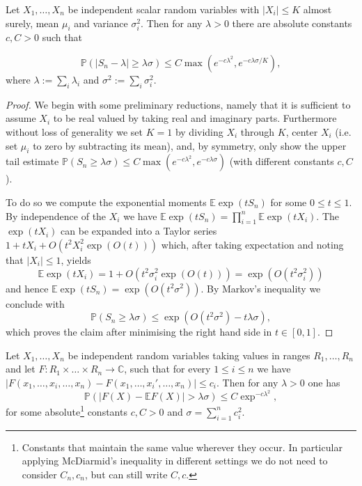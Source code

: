 \begin{theorem}
	Let $X_1,\dots,X_n$ be independent scalar random variables with $|X_i|\leq K$ almost surely, mean $\mu_i$ and variance $\sigma_i^2$. Then for any $\lambda>0$ there are absolute constants $c,C>0$ such that 
	
	$$\mathbb P(|S_n-\lambda|\geq\lambda\sigma)\leq C\max(e^{-c\lambda^2}, e^{-c\lambda\sigma/K}),$$
	where $\lambda:=\sum_i \lambda_i$ and $\sigma^2:=\sum_i \sigma_i^2$.
\end{theorem}
\begin{proof}
	We begin with some preliminary reductions, namely that it is sufficient to assume $X_i$ to be real valued by taking real and imaginary parts. Furthermore without loss of generality we set $K=1$ by dividing $X_i$ through $K$, center $X_i$ (i.e. set $\mu_i$ to zero by subtracting its mean), and, by symmetry, only show the upper tail estimate $\mathbb P(S_n\geq\lambda\sigma)\leq C\max(e^{-c\lambda^2}, e^{-c\lambda\sigma})$ (with different constants $c,C$).
	
	To do so we compute the exponential moments $\mathbb E \exp(tS_n)$ for some $0\leq t\leq 1$. By independence of the $X_i$ we have $\mathbb E \exp(tS_n)=\prod_{i=1}^n \mathbb E \exp(tX_i)$. The $\exp(tX_i)$ can be expanded into a Taylor series $1+tX_i+O(t^2X_i^2\exp(O(t)))$ which, after taking expectation and noting that $|X_i|\leq 1$, yields
	$$\mathbb E\exp(tX_i)=1+O(t^2\sigma_i^2\exp(O(t)))=\exp(O(t^2\sigma_i^2))$$
	and hence $\mathbb E\exp(tS_n)=\exp(O(t^2\sigma^2))$. By Markov's inequality we conclude with $$\mathbb P(S_n\geq\lambda\sigma)\leq\exp(O(t^2\sigma^2)-t\lambda\sigma),$$ which proves the claim after minimising the right hand side in $t\in[0,1]$.
\end{proof}

\begin{theorem}
	Let $X_1,\dots,X_n$ be independent random variables taking values in ranges $R_1,\dots,R_n$ and let $F:R_1\times\dots\times R_n\rightarrow\mathbb C$, such that for every $1\leq i\leq n$ we have $|F(x_1,\dots,x_i,\dots,x_n)-F(x_1,\dots,x_i',\dots,x_n)|\leq c_i$. Then for any $\lambda>0$ one has $$\mathbb P(|F(X)-\mathbb EF(X)|>\lambda\sigma)\leq C\exp^{-c\lambda^2},$$ for some absolute\footnote{Constants that maintain the same value wherever they occur. In particular applying McDiarmid's inequality in different settings we do not need to consider $C_n, c_n$, but can still write $C,c$.} constants $c,C>0$ and $\sigma=\sum_{i=1}^n c_i^2$.
\end{theorem}

